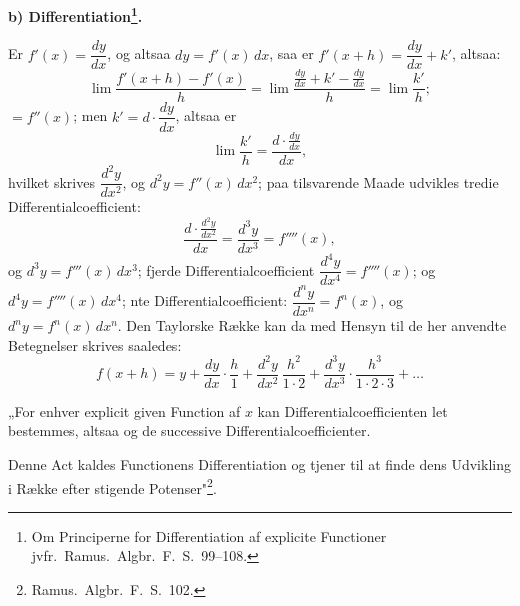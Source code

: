 \documentclass[12pt]{book}
\newcommand{\opage}[1]{\marginnote{\footnotesize\textit{[#1]}}}
\begin{document}
\begin{center}
\textbf{b) Differentiation\footnote{Om Principerne for Differentiation af explicite
Functioner jvfr.\ Ramus.\ Algbr.\ F.\ S.\ 99--108.}.}
\end{center}
{}

Er $f'(x) = \dfrac{dy}{dx}$, og altsaa $dy = f'(x)\,dx$, saa er
$f'(x + h) = \dfrac{dy}{dx} + k'$, altsaa:
\[
\lim\frac{f'(x + h) - f'(x)}{h} = \lim\frac{\frac{dy}{dx} + k' - \frac{dy}{dx}}{h}
= \lim\frac{k'}{h};
\]
$= f''(x)$; men $k' = d\cdot\dfrac{dy}{dx}$,
\opage{57} altsaa er
\[
\lim\frac{k'}{h} = \frac{d\cdot\frac{dy}{dx}}{dx},
\]
hvilket skrives $\dfrac{d^{2}y}{dx^{2}}$, og $d^{2}y = f''(x)\,dx^{2}$; paa
tilsvarende Maade udvikles tredie Differentialcoefficient:
\[
\frac{d\cdot\frac{d^{2}y}{dx^{2}}}{dx} = \frac{d^{3}y}{dx^{3}} = f''''(x),
\]
og $d^{3}y = f'''(x)\,dx^{3}$; fjerde Differentialcoefficient
$\dfrac{d^{4}y}{dx^{4}} = f''''(x)$; og $d^{4}y = f''''(x)\,dx^{4}$; nte
Differentialcoefficient: $\dfrac{d^{n}y}{dx^{n}} = f^{n}(x)$, og
$d^{n}y = f^{n}(x)\,dx^{n}$. Den Taylorske Række kan da med Hensyn til de her
anvendte Betegnelser skrives saaledes:
\[
f(x + h) = y + \frac{dy}{dx}\cdot\frac{h}{1} + \frac{d^{2}y}{dx^{2}}\,
\frac{h^{2}}{1\cdot2} + \frac{d^{3}y}{dx^{3}}\cdot\frac{h^{3}}{1\cdot2\cdot3} + \dots
\]

„For enhver explicit given Function af $x$ kan Differentialcoefficienten let
bestemmes, altsaa og de successive Differentialcoefficienter.

Denne Act kaldes Functionens Differentiation og tjener til at finde dens Udvikling
i Række efter stigende Potenser"\footnote{Ramus.\ Algbr.\ F.\ S.\ 102.}.
\end{document}
